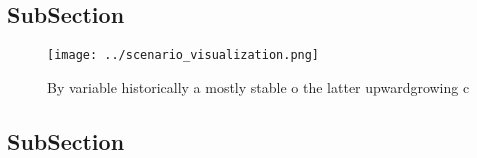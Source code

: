 \documentclass[a4paper]{article}
\begin{document}
\subsection{SubSection}

\begin{figure}
\centering
\texttt{[image: ../scenario\_visualization.png]}
\caption{By variable historically a mostly stable o the latter upwardgrowing c
}
\end{figure}
 
\subsection{SubSection}
\end{document}
